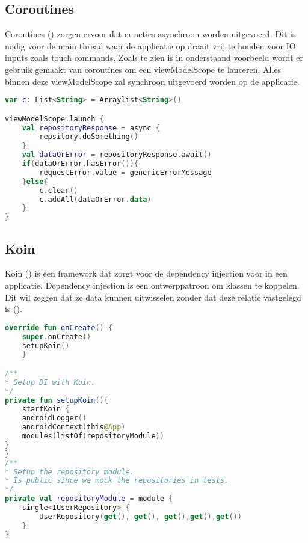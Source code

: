 \subsection{Coroutines}
Coroutines (\cite{KOTLIN_COROUTINE}) zorgen ervoor dat er acties asynchroon worden uitgevoerd. Dit is nodig voor de main thread waar de applicatie op draait vrij te houden voor IO inputs zoals touch commands.
Zoals te zien is in onderstaand voorbeeld wordt er gebruik gemaakt van coroutines om een viewModelScope te lanceren. Alles binnen deze viewModelScope zal synchroon uitgevoerd worden op de applicatie.

\begin{lstlisting}[caption=Coroutine, language=Kotlin]
var c: List<String> = Arraylist<String>()

viewModelScope.launch {
	val repositoryResponse = async {
		repsitory.doSomething()
	}
	val dataOrError = repositoryResponse.await()
	if(dataOrError.hasError()){
		requestError.value = genericErrorMessage
	}else{
		c.clear()
		c.addAll(dataOrError.data)
	}
}
\end{lstlisting}

\subsection{Koin}
Koin (\cite{KOTLIN_KOIN}) is een framework dat zorgt voor de dependency injection voor in een applicatie. Dependency injection is een ontwerppatroon om klassen te koppelen. Dit wil zeggen dat ze data kunnen uitwisselen zonder dat deze relatie vastgelegd is (\cite{KOTLIN_KOIN_DEPENDENCYINJECTION}).

\begin{lstlisting}[caption=Koin, language=Kotlin]
override fun onCreate() {
	super.onCreate()
	setupKoin()
	}

/**
* Setup DI with Koin.
*/
private fun setupKoin(){
	startKoin {
	androidLogger()
	androidContext(this@App)
	modules(listOf(repositoryModule))
}
}
/**
* Setup the repository module.
* Is public since we mock the repositories in tests.
*/
private val repositoryModule = module {
	single<IUserRepository> {
		UserRepository(get(), get(), get(),get(),get())
	}
}
\end{lstlisting}